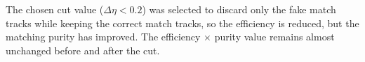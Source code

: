         
        
                The chosen cut value ($\Delta \eta < 0.2$) was selected to discard only the fake match tracks while keeping the correct match tracks, so the efficiency is reduced, but the matching purity has improved. The efficiency $\times$ purity value remains almost unchanged before and after the cut.